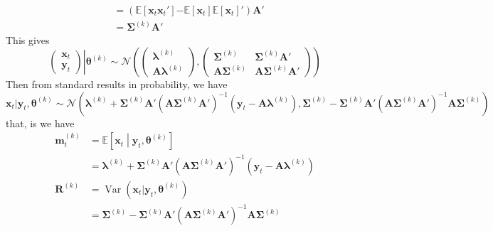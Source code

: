 \documentclass[letterpaper,10pt]{amsart}
\newcommand{\E}[1]{\mathbb{E}\!\left[#1\right]}
\newcommand{\Var}{\operatorname{Var}}
\newcommand{\sN}{\mathcal{N}}
\begin{document}
\begin{enumerate}[{1}.1]
\begin{align*}
&= \left(\E{\boldsymbol x_t \boldsymbol x_t'}\boldsymbol  - \E{\boldsymbol x_t}\E{\boldsymbol x_t}'\right) \boldsymbol A'\\
&= \boldsymbol \Sigma^{(k)} \boldsymbol A'
\end{align*}
This gives
\[\left.\begin{pmatrix}
\boldsymbol x_t \\ 
\boldsymbol y_t
\end{pmatrix}\right | \boldsymbol \theta^{(k)} \sim \sN\left( \begin{pmatrix}
\boldsymbol \lambda^{(k)} \\ \boldsymbol A \boldsymbol \lambda^{(k)}
\end{pmatrix}, \begin{pmatrix}
\boldsymbol \Sigma^{(k)} & \boldsymbol \Sigma^{(k)} \boldsymbol A'\\
\boldsymbol A \boldsymbol \Sigma^{(k)} & \boldsymbol A \boldsymbol \Sigma^{(k)} \boldsymbol A'
\end{pmatrix}  \right) \]
Then from standard results in probability, we have
\[\boldsymbol x_t | \boldsymbol y_t, \boldsymbol \theta^{(k)} \sim \sN(\boldsymbol \lambda^{(k)} + \boldsymbol \Sigma^{(k)} \boldsymbol A' (\boldsymbol A \boldsymbol \Sigma^{(k)} \boldsymbol A')^{-1} (\boldsymbol y_t - \boldsymbol A \boldsymbol \lambda^{(k)}), \boldsymbol \Sigma^{(k)} - \boldsymbol \Sigma^{(k)}\boldsymbol A'(\boldsymbol A \boldsymbol \Sigma^{(k)} \boldsymbol A')^{-1} \boldsymbol A \boldsymbol \Sigma^{(k)}) \]
that, is we have 
\begin{align*}
\boldsymbol m_t^{(k)} &= \E{\boldsymbol x_t \middle| \boldsymbol y_t, \boldsymbol \theta^{(k)}}\\
&= \boldsymbol \lambda^{(k)} + \boldsymbol \Sigma^{(k)} \boldsymbol A' (\boldsymbol A \boldsymbol \Sigma^{(k)} \boldsymbol A')^{-1} (\boldsymbol y_t - \boldsymbol A \boldsymbol \lambda^{(k)})\\
\boldsymbol R^{(k)} &= \Var(\boldsymbol x_t | \boldsymbol y_t, \boldsymbol \theta^{(k)})\\
&=  \boldsymbol \Sigma^{(k)} - \boldsymbol \Sigma^{(k)}\boldsymbol A'(\boldsymbol A \boldsymbol \Sigma^{(k)} \boldsymbol A')^{-1} \boldsymbol A \boldsymbol \Sigma^{(k)}
\end{align*}


\end{enumerate}
\end{document}
